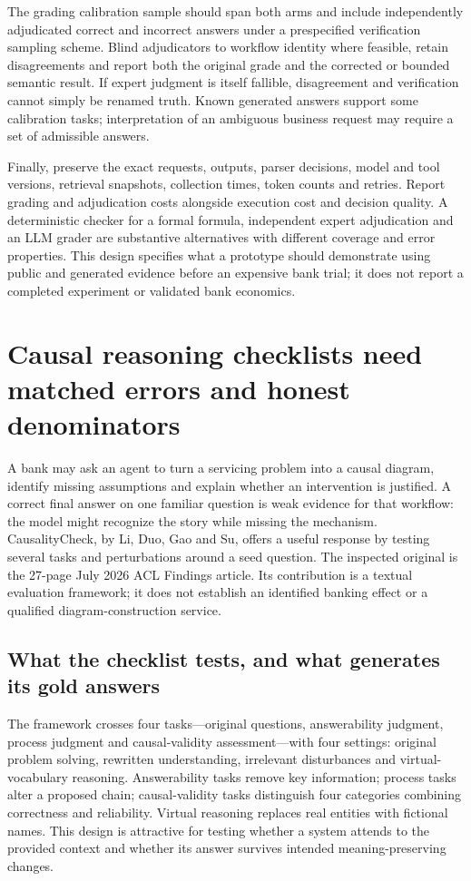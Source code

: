 The grading calibration sample should span both arms and include independently
adjudicated correct and incorrect answers under a prespecified verification
sampling scheme. Blind adjudicators to workflow identity where feasible, retain
disagreements and report both the original grade and the corrected or bounded
semantic result. If expert judgment is itself fallible, disagreement and
verification cannot simply be renamed truth. Known generated answers support
some calibration tasks; interpretation of an ambiguous business request may
require a set of admissible answers.

Finally, preserve the exact requests, outputs, parser decisions, model and tool
versions, retrieval snapshots, collection times, token counts and retries.
Report grading and adjudication costs alongside execution cost and decision
quality. A deterministic checker for a formal formula, independent expert
adjudication and an LLM grader are substantive alternatives with different
coverage and error properties. This design specifies what a prototype should
demonstrate using public and generated evidence before an expensive bank trial;
it does not report a completed experiment or validated bank economics.



\section{Causal reasoning checklists need matched errors and honest denominators}
\label{exec21:check-scope}
A bank may ask an agent to turn a servicing problem into a causal diagram, identify missing assumptions and explain whether an intervention is justified. A correct final answer on one familiar question is weak evidence for that workflow: the model might recognize the story while missing the mechanism. CausalityCheck, by Li, Duo, Gao and Su, offers a useful response by testing several tasks and perturbations around a seed question. The inspected original is the 27-page July 2026 ACL Findings article. Its contribution is a textual evaluation framework; it does not establish an identified banking effect or a qualified diagram-construction service.~\citep{exec21_causalitycheck}

\subsection{What the checklist tests, and what generates its gold answers}
\label{exec21:check-design}
The framework crosses four tasks---original questions, answerability judgment, process judgment and causal-validity assessment---with four settings: original problem solving, rewritten understanding, irrelevant disturbances and virtual-vocabulary reasoning. Answerability tasks remove key information; process tasks alter a proposed chain; causal-validity tasks distinguish four categories combining correctness and reliability. Virtual reasoning replaces real entities with fictional names. This design is attractive for testing whether a system attends to the provided context and whether its answer survives intended meaning-preserving changes.~\citep{exec21_causalitycheck}

